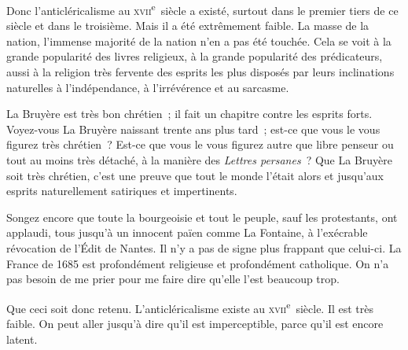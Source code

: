 \documentclass[french,twoside]{book} %
\newcommand{\astertri}{\medskip\par\centerline{\color{rubric}\large\selectfont{\syms ✻\,✻\,✻}}\medskip\par}%
\begin{document}
\astertri

\noindent Donc l’anticléricalisme au \textsc{xvii}\textsuperscript{e} siècle a existé, surtout dans le premier tiers de ce siècle et dans le troisième. Mais il a été extrêmement faible. La masse de la nation, l’immense majorité de la nation n’en a pas été touchée. Cela se voit à la grande popularité des livres religieux, à la grande popularité des prédicateurs, aussi à la religion très fervente des esprits les plus disposés par leurs inclinations naturelles à l’indépendance, à l’irrévérence et au sarcasme.\par
La Bruyère est très bon chrétien ; il fait un  chapitre contre les esprits forts. Voyez-vous La Bruyère naissant trente ans plus tard ; est-ce que vous le vous figurez très chrétien ? Est-ce que vous le vous figurez autre que libre penseur ou tout au moins très détaché, à la manière des \emph{Lettres persanes} ? Que La Bruyère soit très chrétien, c’est une preuve que tout le monde l’était alors et jusqu’aux esprits naturellement satiriques et impertinents.\par
Songez encore que toute la bourgeoisie et tout le peuple, sauf les protestants, ont applaudi, tous jusqu’à un innocent païen comme La Fontaine, à l’exécrable révocation de l’Édit de Nantes. Il n’y a pas de signe plus frappant que celui-ci. La France de 1685 est profondément religieuse et profondément catholique. On n’a pas besoin de me prier pour me faire dire qu’elle l’est beaucoup trop.\par
Que ceci soit donc retenu. L’anticléricalisme existe au \textsc{xvii}\textsuperscript{e} siècle. Il est très faible. On peut aller jusqu’à dire qu’il est imperceptible, parce qu’il est encore latent.\par

\astertri
\end{document}
